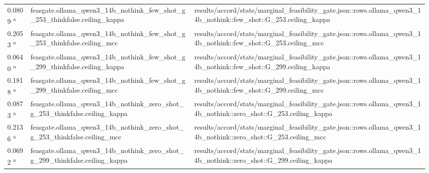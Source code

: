 \begin{longtable}{@{}p{0.7in}p{1.9in}p{2.6in}@{}}
0.0809 \textsuperscript{a} & feasgate.\allowbreak{}ollama\_qwen3\_14b\_nothink\_few\_shot\_g\_253\_thinkfalse.\allowbreak{}ceiling\_kappa & results/\allowbreak{}accord/\allowbreak{}stats/\allowbreak{}marginal\_feasibility\_gate.\allowbreak{}json::rows.\allowbreak{}ollama\_qwen3\_14b\_nothink::few\_shot::G\_253.\allowbreak{}ceiling\_kappa\\
0.2053 \textsuperscript{a} & feasgate.\allowbreak{}ollama\_qwen3\_14b\_nothink\_few\_shot\_g\_253\_thinkfalse.\allowbreak{}ceiling\_mcc & results/\allowbreak{}accord/\allowbreak{}stats/\allowbreak{}marginal\_feasibility\_gate.\allowbreak{}json::rows.\allowbreak{}ollama\_qwen3\_14b\_nothink::few\_shot::G\_253.\allowbreak{}ceiling\_mcc\\
0.0640 \textsuperscript{a} & feasgate.\allowbreak{}ollama\_qwen3\_14b\_nothink\_few\_shot\_g\_299\_thinkfalse.\allowbreak{}ceiling\_kappa & results/\allowbreak{}accord/\allowbreak{}stats/\allowbreak{}marginal\_feasibility\_gate.\allowbreak{}json::rows.\allowbreak{}ollama\_qwen3\_14b\_nothink::few\_shot::G\_299.\allowbreak{}ceiling\_kappa\\
0.1818 \textsuperscript{a} & feasgate.\allowbreak{}ollama\_qwen3\_14b\_nothink\_few\_shot\_g\_299\_thinkfalse.\allowbreak{}ceiling\_mcc & results/\allowbreak{}accord/\allowbreak{}stats/\allowbreak{}marginal\_feasibility\_gate.\allowbreak{}json::rows.\allowbreak{}ollama\_qwen3\_14b\_nothink::few\_shot::G\_299.\allowbreak{}ceiling\_mcc\\
0.0873 \textsuperscript{a} & feasgate.\allowbreak{}ollama\_qwen3\_14b\_nothink\_zero\_shot\_g\_253\_thinkfalse.\allowbreak{}ceiling\_kappa & results/\allowbreak{}accord/\allowbreak{}stats/\allowbreak{}marginal\_feasibility\_gate.\allowbreak{}json::rows.\allowbreak{}ollama\_qwen3\_14b\_nothink::zero\_shot::G\_253.\allowbreak{}ceiling\_kappa\\
0.2136 \textsuperscript{a} & feasgate.\allowbreak{}ollama\_qwen3\_14b\_nothink\_zero\_shot\_g\_253\_thinkfalse.\allowbreak{}ceiling\_mcc & results/\allowbreak{}accord/\allowbreak{}stats/\allowbreak{}marginal\_feasibility\_gate.\allowbreak{}json::rows.\allowbreak{}ollama\_qwen3\_14b\_nothink::zero\_shot::G\_253.\allowbreak{}ceiling\_mcc\\
0.0692 \textsuperscript{a} & feasgate.\allowbreak{}ollama\_qwen3\_14b\_nothink\_zero\_shot\_g\_299\_thinkfalse.\allowbreak{}ceiling\_kappa & results/\allowbreak{}accord/\allowbreak{}stats/\allowbreak{}marginal\_feasibility\_gate.\allowbreak{}json::rows.\allowbreak{}ollama\_qwen3\_14b\_nothink::zero\_shot::G\_299.\allowbreak{}ceiling\_kappa\\

\end{longtable}
